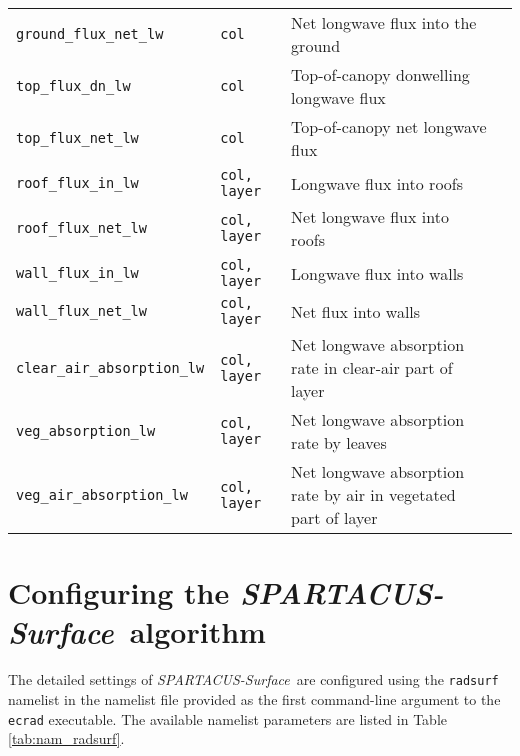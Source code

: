 \documentclass[a4,oneside]{article}
\def\codesize{\small}
\def\codetabsize{\footnotesize}
\def\spsurf{\emph{SPARTACUS-Surface}}
\def\code#1{{\codesize\texttt{#1}}}
\def\codetab#1{{\codetabsize\texttt{#1}}}
\begin{document}
\begin{center}
\begin{longtable}{llLp{7cm}}
\codetab{ground\_flux\_net\_lw} & \codetab{col} & Net longwave flux into the ground\\
\codetab{top\_flux\_dn\_lw} & \codetab{col} & Top-of-canopy donwelling longwave flux\\
\codetab{top\_flux\_net\_lw} & \codetab{col} & Top-of-canopy net longwave flux\\
\codetab{roof\_flux\_in\_lw} & \codetab{col, layer} & Longwave flux into roofs\\
\codetab{roof\_flux\_net\_lw} & \codetab{col, layer} & Net longwave flux into roofs\\
\codetab{wall\_flux\_in\_lw} & \codetab{col, layer} & Longwave flux into walls\\
\codetab{wall\_flux\_net\_lw} & \codetab{col, layer} & Net flux into walls\\
\codetab{clear\_air\_absorption\_lw} & \codetab{col, layer} & Net longwave absorption rate in clear-air part of layer\\
\codetab{veg\_absorption\_lw} & \codetab{col, layer} & Net longwave absorption rate by leaves\\
\codetab{veg\_air\_absorption\_lw} & \codetab{col, layer} & Net longwave absorption rate by air in vegetated part of layer\\
\hline
\end{longtable}
\end{center}


\section{Configuring the \spsurf\ algorithm}
\label{sec:nam_radsurf}
The detailed settings of \spsurf\ are configured using the
\code{radsurf} namelist in the namelist file provided as the first
command-line argument to the \code{ecrad} executable. The available
namelist parameters are listed in Table \ref{tab:nam_radsurf}. 

\end{document}

